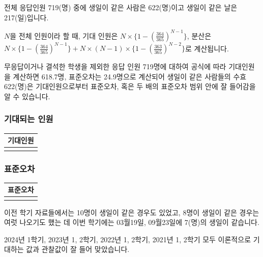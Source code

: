 \documentclass[
]{book}
\begin{document}
전체 응답인원 719(명) 중에 생일이 같은 사람은 622(명)이고 생일이 같은 날은 217(일)입니다.

\(N\)을 전체 인원이라 할 때, 기대 인원은 \(N\times\{1- (\frac{364}{365})^{N-1}\}\),
분산은 \(N\times\{1- (\frac{364}{365})^{N-1}\} + N\times(N-1)\times\{1-(\frac{363}{365})^{N-2}\}\)로 계산됩니다.

무응답이거나 결석한 학생을 제외한 응답 인원 719명에 대하여 공식에 따라 기대인원을 계산하면 618.7명, 표준오차는 24.9명으로 계산되어 생일이 같은 사람들의 수효 622(명)은 기대인원으로부터 표준오차, 혹은 두 배의 표준오차 범위 안에 잘 들어감을 알 수 있습니다.

\subsubsection{기대되는 인원}\label{uxae30uxb300uxb418uxb294-uxc778uxc6d0}

\begin{longtable}[]{@{}
  >{\centering\arraybackslash}p{}@{}}
\toprule\noalign{}
\begin{minipage}[b]{\linewidth}\centering
기대인원
\end{minipage} \\
\midrule\noalign{}
\endhead
\bottomrule\noalign{}
\endlastfoot
618.7 \\
\end{longtable}

\subsubsection{표준오차}\label{uxd45cuxc900uxc624uxcc28}

\begin{longtable}[]{@{}
  >{\centering\arraybackslash}p{}@{}}
\toprule\noalign{}
\begin{minipage}[b]{\linewidth}\centering
표준오차
\end{minipage} \\
\midrule\noalign{}
\endhead
\bottomrule\noalign{}
\endlastfoot
24.9 \\
\end{longtable}

이전 학기 자료들에서는 10명이 생일이 같은 경우도 있었고, 8명이 생일이 같은 경우는 여럿 나오기도 했는 데 이번 학기에는 03월19일, 09월23일에 7(명)의 생일이 같습니다.

2024년 1학기, 2023년 1, 2학기, 2022년 1, 2학기, 2021년 1, 2학기 모두 이론적으로 기대하는 값과 관찰값이 잘 들어 맞았습니다.
\end{document}
